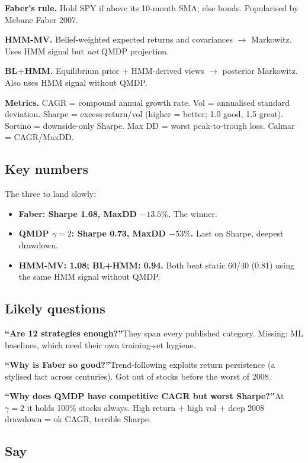 \documentclass[11pt]{article}
\begin{document}
\textbf{Faber's rule.} Hold SPY if above its 10-month SMA; else bonds. Popularised by Mebane Faber 2007.

\textbf{HMM-MV.} Belief-weighted expected returns and covariances $\to$ Markowitz. Uses HMM signal but \emph{not} QMDP projection.

\textbf{BL+HMM.} Equilibrium prior + HMM-derived views $\to$ posterior Markowitz. Also uses HMM signal without QMDP.

\textbf{Metrics.} CAGR = compound annual growth rate. Vol = annualised standard deviation. Sharpe = excess-return/vol (higher = better; 1.0 good, 1.5 great). Sortino = downside-only Sharpe. Max DD = worst peak-to-trough loss. Calmar = CAGR/MaxDD.

\subsection*{Key numbers}

The three to land slowly:
\begin{itemize}
  \item \textbf{Faber: Sharpe 1.68, MaxDD $-13.5\%$.} The winner.
  \item \textbf{QMDP $\gamma{=}2$: Sharpe 0.73, MaxDD $-53\%$.} Last on Sharpe, deepest drawdown.
  \item \textbf{HMM-MV: 1.08; BL+HMM: 0.94.} Both beat static 60/40 (0.81) using the same HMM signal without QMDP.
\end{itemize}

\subsection*{Likely questions}

\textbf{``Are 12 strategies enough?''}\quad They span every published category. Missing: ML baselines, which need their own training-set hygiene.

\textbf{``Why is Faber so good?''}\quad Trend-following exploits return persistence (a stylised fact across centuries). Got out of stocks before the worst of 2008.

\textbf{``Why does QMDP have competitive CAGR but worst Sharpe?''}\quad At $\gamma = 2$ it holds 100\% stocks always. High return + high vol + deep 2008 drawdown = ok CAGR, terrible Sharpe.

\subsection*{Say}
\end{document}
